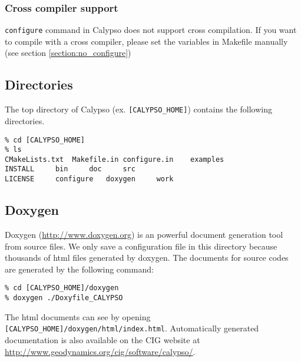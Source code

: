 \subsubsection*{Cross compiler support}
{\tt configure} command in Calypso does not support cross compilation. If you want to compile with a cross compiler, please set the variables in Makefile manually (see section \ref{section:no_configure})

\subsection{Directories}

The top directory of Calypso (ex. \verb|[CALYPSO_HOME]|) contains the following directories.
\begin{verbatim}
% cd [CALYPSO_HOME]
% ls
CMakeLists.txt	Makefile.in	configure.in	examples
INSTALL		bin		doc		src
LICENSE		configure	doxygen		work

\end{verbatim}


\subsection{Doxygen}
Doxygen (\url{http://www.doxygen.org}) is an powerful document generation tool from source files. We only save a configuration file in this directory because thousands of html files generated by doxygen. The documents for source codes are generated by the following command:
% 
\begin{verbatim}
% cd [CALYPSO_HOME]/doxygen
% doxygen ./Doxyfile_CALYPSO
\end{verbatim}
%
The html documents can see by opening \verb|[CALYPSO_HOME]/doxygen/html/index.html|.  Automatically generated documentation is also available on the CIG website at \url{http://www.geodynamics.org/cig/software/calypso/}.

